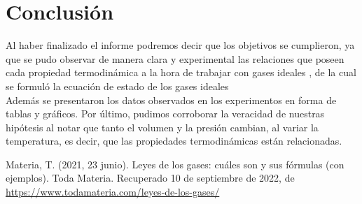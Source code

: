 \documentclass[a4paper, 12p]{article}
\begin{document}
\section[]{Conclusión}
Al haber finalizado el informe podremos decir que los objetivos se cumplieron, ya que se pudo observar de manera clara y experimental las relaciones que poseen cada propiedad termodinámica a la hora de trabajar con gases ideales ,
 de la cual se formuló la ecuación de estado de los gases ideales  \\ %
 Además se presentaron los datos observados en los experimentos en forma de tablas y gráficos. 
Por último, pudimos corroborar la veracidad de nuestras hipótesis al notar que tanto el volumen y la presión cambian, al variar la temperatura,
es decir, que las propiedades termodinámicas están relacionadas.









\begin{thebibliography}{6}
       Materia, T. (2021, 23 junio). Leyes de los gases: cuáles son y sus fórmulas (con ejemplos). Toda Materia. Recuperado 10 de septiembre de 2022, 
      de \url{https://www.todamateria.com/leyes-de-los-gases/}
\end{thebibliography}
\end{document}
